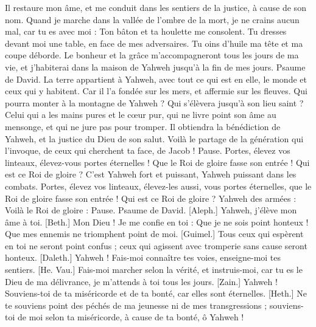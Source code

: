 \begin{multicols}{2}
Il restaure mon âme, et me conduit dans les sentiers de la justice, à cause de son nom.
Quand je marche dans la vallée de l'ombre de la mort, je ne crains aucun mal, car tu es avec moi : Ton bâton et ta houlette me consolent.
Tu dresses devant moi une table, en face de mes adversaires. Tu oins d'huile ma tête et ma coupe déborde.
Le bonheur et la grâce m'accompagneront tous les jours de ma vie, et j’habiterai dans la maison de Yahweh jusqu’à la fin de mes jours.
\VerseOne{}Psaume de David. La terre appartient à Yahweh, avec tout ce qui est en elle, le monde et ceux qui y habitent.
Car il l'a fondée sur les mers, et affermie sur les fleuves.
Qui pourra monter à la montagne de Yahweh ? Qui s’élèvera jusqu’à son lieu saint ?
Celui qui a les mains pures et le cœur pur, qui ne livre point son âme au mensonge, et qui ne jure pas pour tromper.
Il obtiendra la bénédiction de Yahweh, et la justice du Dieu de son salut.
Voilà le partage de la génération qui l'invoque, de ceux qui cherchent ta face, de Jacob ! Pause.
Portes, élevez vos linteaux, élevez-vous portes éternelles ! Que le Roi de gloire fasse son entrée !
Qui est ce Roi de gloire ? C'est Yahweh fort et puissant, Yahweh puissant dans les combats.
Portes, élevez vos linteaux, élevez-les aussi, vous portes éternelles, que le Roi de gloire fasse son entrée !
Qui est ce Roi de gloire ? Yahweh des armées : Voilà le Roi de gloire : Pause.
\VerseOne{}Psaume de David. [Aleph.] Yahweh, j'élève mon âme à toi.
[Beth.] Mon Dieu ! Je me confie en toi : Que je ne sois point honteux ! Que mes ennemis ne triomphent point de moi.
[Guimel.] Tous ceux qui espèrent en toi ne seront point confus ; ceux qui agissent avec tromperie sans cause seront honteux.
[Daleth.] Yahweh ! Fais-moi connaître tes voies, enseigne-moi tes sentiers.
[He. Vau.] Fais-moi marcher selon la vérité, et instruis-moi, car tu es le Dieu de ma délivrance, je m'attends à toi tous les jours.
[Zain.] Yahweh ! Souviens-toi de ta miséricorde et de ta bonté, car elles sont éternelles.
[Heth.] Ne te souviens point des péchés de ma jeunesse ni de mes transgressions ; souviens-toi de moi selon ta miséricorde, à cause de ta bonté, ô Yahweh !

\end{multicols}
